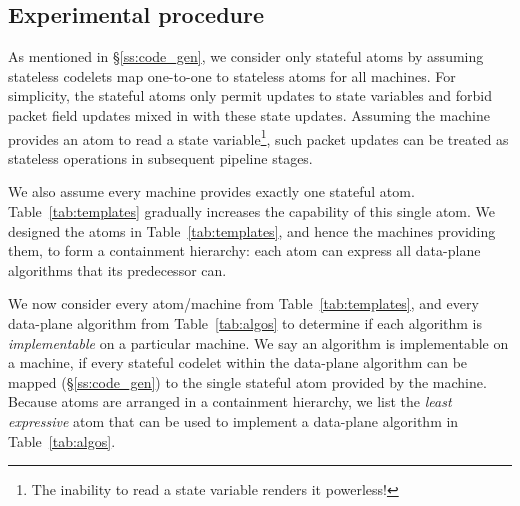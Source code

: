 \subsection{Experimental procedure}
As mentioned in \S\ref{ss:code_gen}, we consider only stateful atoms by
assuming stateless codelets map one-to-one to stateless atoms for all
\absmachine machines. For simplicity, the stateful atoms only permit updates to
state variables and forbid packet field updates mixed in with these state
updates.  Assuming the \absmachine machine provides an atom to read a state
variable\footnote{The inability to read a state variable renders it
powerless!}, such packet updates can be treated as stateless operations in
subsequent pipeline stages.

We also assume every \absmachine machine provides exactly one stateful atom.
Table~\ref{tab:templates} gradually increases the capability of this single
atom.  We designed the atoms in Table~\ref{tab:templates}, and hence the
\absmachine machines providing them, to form a containment hierarchy: each atom
can express all data-plane algorithms that its predecessor can.

We now consider every atom/\absmachine machine from Table~\ref{tab:templates},
and every data-plane algorithm from Table~\ref{tab:algos} to determine if each
algorithm is \textit{implementable} on a particular \absmachine machine. We say
an algorithm is implementable on a \absmachine machine, if every stateful
codelet within the data-plane algorithm can be mapped (\S\ref{ss:code_gen}) to
the single stateful atom provided by the \absmachine machine. Because atoms are
arranged in a containment hierarchy, we list the \textit{least expressive} atom
that can be used to implement a data-plane algorithm in Table~\ref{tab:algos}.

%
%
%
